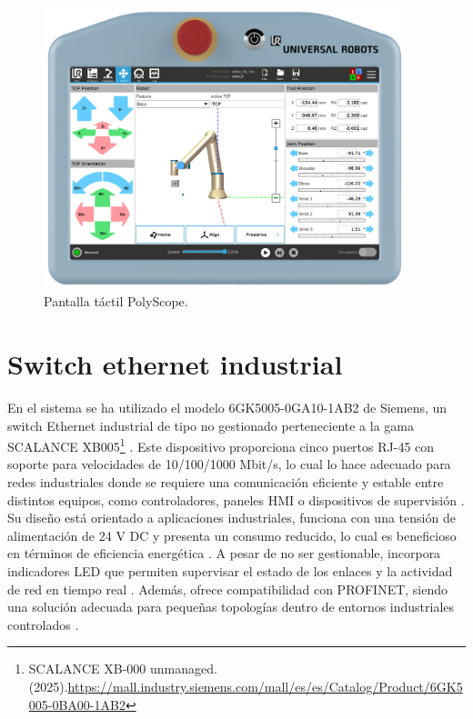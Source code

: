 \begin{figure} [h!]
  \begin{center}
    \includegraphics[width=10.5cm]{figs/PolyScope}
  \end{center}
  \caption{\centering Pantalla táctil PolyScope. \cite{PloyScope_img}}
  \label{fig:PolyScope}
\end{figure} 

\section{Switch ethernet industrial}
\label{sec:switch_industrial}

En el sistema se ha utilizado el modelo 6GK5005-0GA10-1AB2 de Siemens, un switch Ethernet industrial de tipo no gestionado perteneciente a la gama SCALANCE XB005\footnote{SCALANCE XB-000 unmanaged. (2025).\url{https://mall.industry.siemens.com/mall/es/es/Catalog/Product/6GK5005-0BA00-1AB2}} \cite{switch_industrial}. Este dispositivo proporciona cinco puertos RJ-45 con soporte para velocidades de 10/100/1000 Mbit/s, lo cual lo hace adecuado para redes industriales donde se requiere una comunicación eficiente y estable entre distintos equipos, como controladores, paneles HMI o dispositivos de supervisión \cite{switch_industrial}.  \\

Su diseño está orientado a aplicaciones industriales, funciona con una tensión de alimentación de 24 V DC y presenta un consumo reducido, lo cual es beneficioso en términos de eficiencia energética \cite{switch_industrial}. A pesar de no ser gestionable, incorpora indicadores LED que permiten supervisar el estado de los enlaces y la actividad de red en tiempo real \cite{switch_industrial}. Además, ofrece compatibilidad con PROFINET, siendo una solución adecuada para pequeñas topologías dentro de entornos industriales controlados \cite{switch_industrial}. \\

